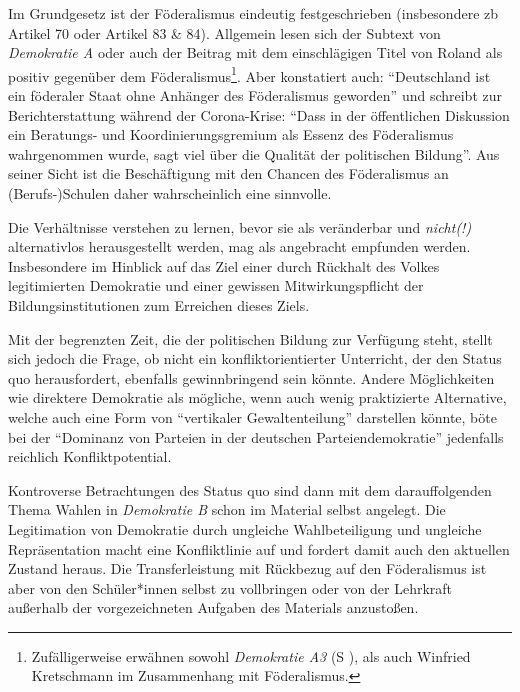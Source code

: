 Im Grundgesetz ist der Föderalismus eindeutig festgeschrieben (insbesondere \gls{zb} Artikel 70 oder Artikel 83 \& 84). %
Allgemein lesen sich der Subtext von \emph{Demokratie A} oder auch der Beitrag mit dem einschlägigen Titel  von Roland \textcite{Sturm.2021} als positiv gegenüber dem Föderalismus\footnote{
    Zufälligerweise erwähnen sowohl \emph{Demokratie A3} (\gls{S} \pageref{DEMOKRATIE-A3}), als auch \textcite[397]{Sturm.2021}  Winfried Kretschmann im Zusammenhang mit Föderalismus.
}. Aber \citeauthor{Sturm.2021} konstatiert auch: \enquote{Deutschland ist ein föderaler Staat ohne Anhänger des Föderalismus geworden} \autocite[397]{Sturm.2021} und schreibt zur Berichterstattung während der Corona-Krise: \enquote{Dass in der öffentlichen Diskussion ein Beratungs- und Koordinierungsgremium als Essenz des Föderalismus wahrgenommen wurde, sagt viel über die Qualität der politischen Bildung}. Aus seiner Sicht ist die Beschäftigung mit den Chancen des Föderalismus an (Berufs-)Schulen daher wahrscheinlich eine sinnvolle. 

Die Verhältnisse verstehen zu lernen, bevor sie als veränderbar und \emph{nicht(!)} alternativlos herausgestellt werden, mag als angebracht empfunden werden. Insbesondere im Hinblick auf das Ziel einer durch Rückhalt des Volkes legitimierten Demokratie und einer gewissen Mitwirkungspflicht der Bildungsinstitutionen zum Erreichen dieses Ziels.

Mit der begrenzten Zeit, die der politischen Bildung zur Verfügung steht, stellt sich jedoch die Frage, ob nicht ein konfliktorientierter Unterricht, der den Status quo herausfordert, ebenfalls gewinnbringend sein könnte. Andere Möglichkeiten wie direktere Demokratie als mögliche, wenn auch wenig praktizierte Alternative, welche auch eine Form von \enquote{vertikaler Gewaltenteilung} darstellen könnte, böte bei der \enquote{Dominanz von Parteien in der deutschen Parteiendemokratie} \autocite[401]{Sturm.2021} jedenfalls reichlich Konfliktpotential. 

Kontroverse Betrachtungen des Status quo sind dann mit dem darauffolgenden Thema Wahlen in \emph{Demokratie B} schon im Material selbst angelegt. Die Legitimation von Demokratie durch ungleiche Wahlbeteiligung und ungleiche Repräsentation macht eine Konfliktlinie auf und fordert damit auch den aktuellen Zustand heraus. Die Transferleistung mit Rückbezug auf den Föderalismus ist aber von den Schüler*innen selbst zu vollbringen oder von der Lehrkraft außerhalb der vorgezeichneten Aufgaben des Materials anzustoßen. 

